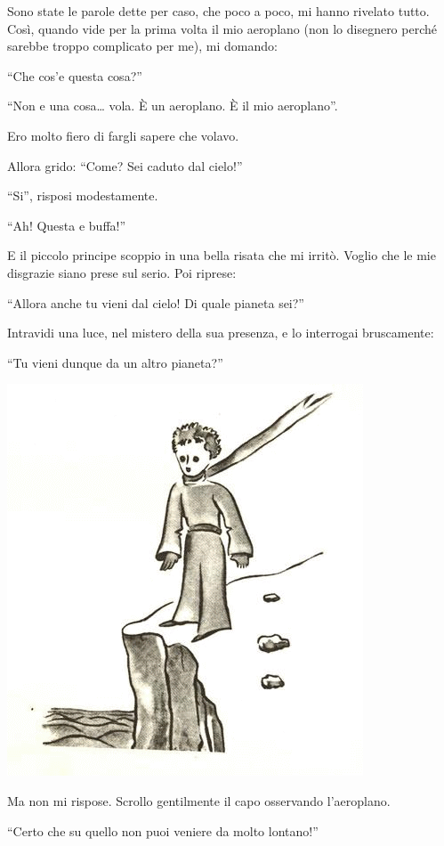 \documentclass[11pt]{scrbook}
\begin{document}
Sono state le parole dette per caso, che poco a poco, mi hanno rivelato
tutto. Così, quando vide per la prima volta il mio aeroplano (non lo
disegnero perché sarebbe troppo complicato per me), mi domando:

``Che cos'e questa cosa?''

``Non e una cosa\ldots{} vola. È un aeroplano. È il mio aeroplano''.

Ero molto fiero di fargli sapere che volavo.

Allora grido: ``Come? Sei caduto dal cielo!''

``Si'', risposi modestamente.

``Ah! Questa e buffa!''

E il piccolo principe scoppio in una bella risata che mi irritò. Voglio
che le mie disgrazie siano prese sul serio. Poi riprese:

``Allora anche tu vieni dal cielo! Di quale pianeta sei?''

Intravidi una luce, nel mistero della sua presenza, e lo interrogai
bruscamente:

``Tu vieni dunque da un altro pianeta?''

\begin{center}
\includegraphics{img/3a}
\end{center}

Ma non mi rispose. Scrollo gentilmente il capo osservando l'aeroplano.

``Certo che su quello non puoi veniere da molto lontano!''
\end{document}
